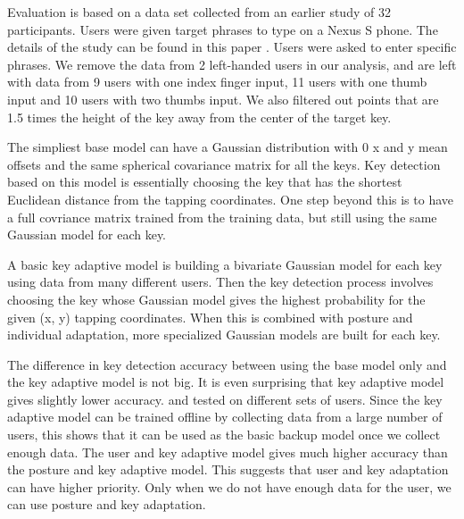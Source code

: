 \documentclass{sigchi}
\begin{document}
Evaluation is based on a data set collected from an earlier study of 32
participants. Users were given target phrases to type on a Nexus S phone. The
details of the study can be found in this paper \cite{}. Users were asked to
enter specific phrases. 
We remove the data from 2 left-handed users in our analysis, and are left with
data from 9 users with one index finger input, 11 users with one thumb input and
10 users with two thumbs input. We also filtered out points that are 1.5 times
the height of the key away from the center of the target key.

The simpliest base model can have a Gaussian distribution with 0 x and y
mean offsets and the same spherical covariance matrix for all the keys. Key
detection based on this model is essentially choosing the key that has the shortest Euclidean distance from the tapping coordinates. 
One step beyond this is to have a full covriance matrix trained from the
training data, but still using the same Gaussian model for each key.

A basic key adaptive model is building a bivariate Gaussian model for each key 
using data from many different users. Then the key detection process involves choosing the key whose Gaussian model gives the highest probability for the given (x, y) tapping coordinates. When this is combined with posture and individual adaptation, more specialized Gaussian models are built for each key.

The difference in key detection accuracy between using the base model only and
the key adaptive model is not big. It is even surprising that key adaptive model
gives slightly lower accuracy. and tested on different sets of users.
Since the key adaptive model can be trained offline by collecting data from a 
large number of users, this shows that it can be used as the basic backup model once we collect enough data. The user and key adaptive model gives much higher accuracy than the posture and key adaptive model. This suggests that user and key adaptation can have higher priority. Only when we do not have enough data for the user, we can use posture and key adaptation.
\end{document}
